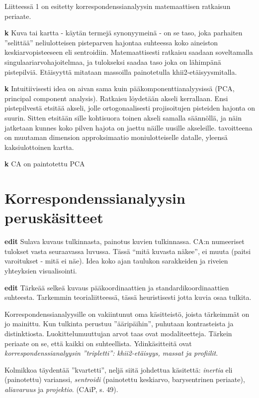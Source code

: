 \documentclass[
  finnish,
]{book}
\begin{document}
Liitteessä 1 on esitetty korrespondenssianalyysin matemaattisen ratkaisun periaate.

\textbf{k} Kuva tai kartta - käytän termejä synonyymeinä - on se taso, joka parhaiten
''selittää'' neliulotteisen pisteparven hajontaa suhteessa koko aineiston
keskiarvopisteeseen eli sentroidiin. Matemaattisesti ratkaisu saadaan
soveltamalla singulaariarvohajoitelmaa, ja tulokseksi saadaa taso joka on
lähimpänä pistepilviä. Etäisyyttä mitataan massoilla painotetulla
khii2-etäisyysmitalla.

\textbf{k} Intuitiivisesti idea on aivan sama kuin pääkomponenttianalyysissä
(PCA, principal component analysis). Ratkaisu löydetään akseli kerrallaan.
Ensi pistepilvestä etsitää akseli, jolle ortogonaalisesti projisoitujen
pisteiden hajonta on suurin. Sitten etsitään sille kohtisuora toinen akseli
samalla säännöllä, ja näin jatketaan kunnes koko pilven hajota on jaettu näille
uusille akseleille. tavoitteena on muutaman dimension approksimaatio
moniulotteiselle datalle, yleensä kaksiulottoinen kartta.

\textbf{k} CA on paintotettu PCA

\hypertarget{korrespondenssianalyysin-peruskuxe4sitteet}{%
\section{Korrespondenssianalyysin peruskäsitteet}\label{korrespondenssianalyysin-peruskuxe4sitteet}}

\textbf{edit} Sulava kuvaus tulkinnasta, painotus kuvien tulkinnassa. CA:n numeeriset
tulokset vasta seuraavassa luvussa. Tässä ``mitä kuvasta näkee'', ei muuta (paitsi
varoitukset - mitä ei näe). Idea koko ajan taulukon sarakkeiden ja riveien yhteyksien
visualisointi.

\textbf{edit} Tärkeää selkeä kuvaus pääkoordinaattien ja standardikoordinaattien
suhteesta. Tarkemmin teorialiitteessä, tässä heuristisesti jotta kuvia osaa tulkita.

Korrespondenssianalyysille on vakiintunut oma käsitteistö, joista tärkeimmät on
jo mainittu. Kun tulkinta perustuu ''ääripäihin'', puhutaan kontrasteista ja
distinktiosta. Luokittelumuuttujan arvot taas ovat modaliteetteja.
Tärkein periaate on se, että kaikki on suhteellista. Ydinkäsitteitä ovat
\emph{korrespondenssianalyysin ''tripletti'': khii2-etäisyys, massat ja profiilit}.

Kolmikkoa täydentää ''kvartetti'', neljä siitä johdettua käsitettä: \emph{inertia} eli
(painotettu) varianssi, \emph{sentroidi} (painotettu keskiarvo, barysentrinen periaate),
\emph{aliavaruus} ja \emph{projektio}. (CAiP, s. 49).
\end{document}
